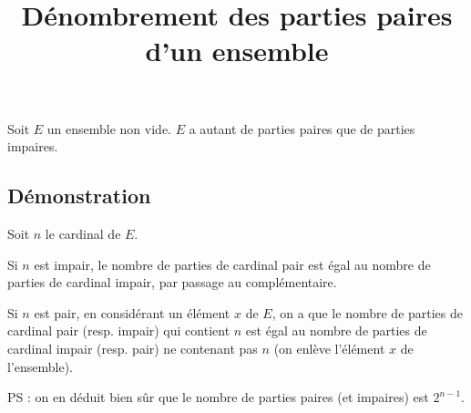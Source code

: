 \documentclass[fontsize=12pt,twoside=false,parskip=half, french]{scrartcl}
\title{Dénombrement des parties paires d’un ensemble}
\date{}
\author{}
\begin{document}
\maketitle
   \begin{Theoreme}
      Soit $E$ un ensemble non vide. $E$ a autant de parties paires que de parties impaires.
   \end{Theoreme}
   \subsection{Démonstration}
      
      Soit $n$ le cardinal de $E$. 
      
      Si $n$ est impair, le nombre de parties de cardinal pair est égal au nombre de parties de cardinal impair, 
      par passage au complémentaire. 
      
      Si $n$ est pair, en considérant un élément $x$ de $E$, on a  que le nombre de parties de cardinal pair 
      (resp. impair) qui contient $n$ est égal au nombre de parties de cardinal impair (resp. pair) ne contenant pas $n$
      (on enlève l’élément $x$ de l’ensemble).
      
      PS : on en déduit bien sûr que le nombre de parties paires (et impaires) est $2^{n - 1}$. 
\end{document}
